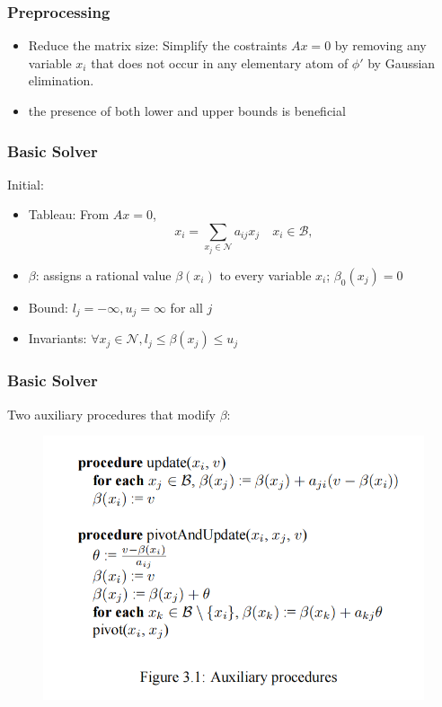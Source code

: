 \documentclass[aspectratio=169%
,serif,mathserif]{beamer}
\begin{document}
\begin{frame}
	\frametitle{Preprocessing}
	\begin{itemize}
		\item Reduce the matrix size: Simplify the costraints $Ax = 0$ by removing any variable $x_i$ that does not occur in any elementary atom of $\phi'$ by Gaussian elimination.
		\item the presence of both lower and upper bounds is beneficial
	\end{itemize}
\end{frame}

\begin{frame}
	\frametitle{Basic Solver}
	Initial:
	\begin{itemize}
		\item Tableau: From $Ax = 0$,
			$$
			x_{i}=\sum_{x_{j} \in \mathcal{N}} a_{i j} x_{j} \quad x_{i} \in \mathcal{B},
			$$
		\item $\beta$: assigns a rational value $\beta(x_i)$ to every variable $x_i$; $\beta_0(x_j) = 0$
		\item Bound: $l_j = -\infty, u_j = \infty$ for all $j$
		\item Invariants: $\forall x_{j} \in \mathcal{N}, l_{j} \leq \beta\left(x_{j}\right) \leq u_{j}$
	\end{itemize}
\end{frame}

\begin{frame}
	\frametitle{Basic Solver}
	Two auxiliary procedures that modify $\beta$:
	\begin{figure}[htbp]
		\includegraphics[width=.6\linewidth]{1.png}
	\end{figure}
\end{frame}
\end{document}
